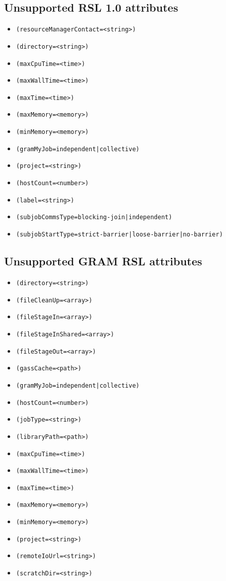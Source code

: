 \documentclass{book}
\begin{document}
  \subsection{Unsupported RSL 1.0 attributes}

  \begin{itemize}
    \item \verb#(resourceManagerContact=<string>)#
    \item \verb#(directory=<string>)#
    \item \verb#(maxCpuTime=<time>)#
    \item \verb#(maxWallTime=<time>)#
    \item \verb#(maxTime=<time>)#
    \item \verb#(maxMemory=<memory>)#
    \item \verb#(minMemory=<memory>)#
    \item \verb#(gramMyJob=independent|collective)#
    \item \verb#(project=<string>)#
    \item \verb#(hostCount=<number>)#
    \item \verb#(label=<string>)#
    \item \verb#(subjobCommsType=blocking-join|independent)#
    \item \verb#(subjobStartType=strict-barrier|loose-barrier|no-barrier)#
  \end{itemize}

  \subsection{Unsupported GRAM RSL attributes}
  
  \begin{itemize}
    \item \verb#(directory=<string>)#
    \item \verb#(fileCleanUp=<array>)#
    \item \verb#(fileStageIn=<array>)#
    \item \verb#(fileStageInShared=<array>)#
    \item \verb#(fileStageOut=<array>)#
    \item \verb#(gassCache=<path>)#
    \item \verb#(gramMyJob=independent|collective)#
    \item \verb#(hostCount=<number>)#
    \item \verb#(jobType=<string>)#
    \item \verb#(libraryPath=<path>)#
    \item \verb#(maxCpuTime=<time>)#
    \item \verb#(maxWallTime=<time>)#
    \item \verb#(maxTime=<time>)#
    \item \verb#(maxMemory=<memory>)#
    \item \verb#(minMemory=<memory>)#
    \item \verb#(project=<string>)#
    \item \verb#(remoteIoUrl=<string>)#
    \item \verb#(scratchDir=<string>)#
  \end{itemize}
\end{document}
